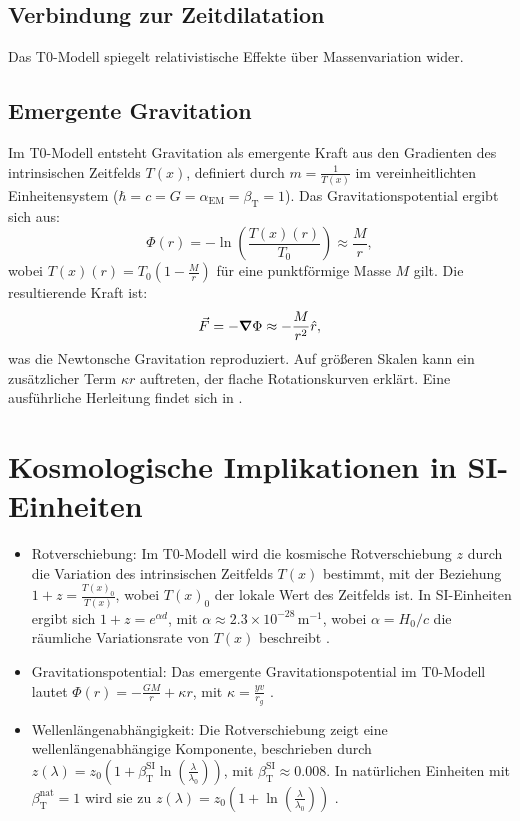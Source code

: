 \documentclass[12pt,a4paper]{article}
\newcommand{\Tfield}{T(x)}
\newcommand{\betaT}{\beta_{\text{T}}}
\newcommand{\alphaEM}{\alpha_{\text{EM}}}
\newcommand{\Tzero}{T_0}
\begin{document}
	\subsection{Verbindung zur Zeitdilatation}
	Das T0-Modell spiegelt relativistische Effekte über Massenvariation wider.
	\subsection{Emergente Gravitation}
	Im T0-Modell entsteht Gravitation als emergente Kraft aus den Gradienten des intrinsischen Zeitfelds \(\Tfield\), definiert durch \( m = \frac{1}{\Tfield} \) im vereinheitlichten Einheitensystem (\(\hbar = c = G = \alphaEM = \betaT = 1\)). Das Gravitationspotential ergibt sich aus:
	\begin{equation}
		\Phi(r) = -\ln\left(\frac{\Tfield(r)}{\Tzero}\right) \approx \frac{M}{r},
	\end{equation}
	wobei \(\Tfield(r) = \Tzero \left(1 - \frac{M}{r}\right)\) für eine punktförmige Masse \(M\) gilt. Die resultierende Kraft ist:
	\begin{equation}
		\vec{F} = -\grad \Phi \approx -\frac{M}{r^2} \hat{r},
	\end{equation}
	was die Newtonsche Gravitation reproduziert. Auf größeren Skalen kann ein zusätzlicher Term \(\kappa r\) auftreten, der flache Rotationskurven erklärt. Eine ausführliche Herleitung findet sich in \cite{pascher_emergente_gravitation_2025, pascher_alphabeta_2025}.
	
	\section{Kosmologische Implikationen in SI-Einheiten}
	\begin{itemize}
		\item Rotverschiebung: Im T0-Modell wird die kosmische Rotverschiebung \(z\) durch die Variation des intrinsischen Zeitfelds \(\Tfield\) bestimmt, mit der Beziehung \(1 + z = \frac{\Tfield_0}{\Tfield}\), wobei \(\Tfield_0\) der lokale Wert des Zeitfelds ist. In SI-Einheiten ergibt sich \(1 + z = e^{\alpha d}\), mit \(\alpha \approx 2.3 \times 10^{-28} \, \text{m}^{-1}\), wobei \(\alpha = H_0/c\) die räumliche Variationsrate von \(\Tfield\) beschreibt \cite{pascher_galaxies_2025, pascher_emergente_gravitation_2025}.
		\item Gravitationspotential: Das emergente Gravitationspotential im T0-Modell lautet \(\Phi(r) = -\frac{GM}{r} + \kappa r\), mit \(\kappa = \frac{y v}{r_g}\) \cite{pascher_emergente_gravitation_2025}.
		\item Wellenlängenabhängigkeit: Die Rotverschiebung zeigt eine wellenlängenabhängige Komponente, beschrieben durch \(z(\lambda) = z_0 \left(1 + \betaT^{\text{SI}} \ln\left(\frac{\lambda}{\lambda_0}\right)\right)\), mit \(\betaT^{\text{SI}} \approx 0.008\). In natürlichen Einheiten mit \(\betaT^{\text{nat}} = 1\) wird sie zu \(z(\lambda) = z_0 \left(1 + \ln\left(\frac{\lambda}{\lambda_0}\right)\right)\) \cite{pascher_temp_2025, pascher_alphabeta_2025}.
	\end{itemize}
	
\end{document}

